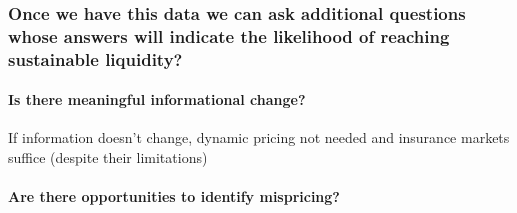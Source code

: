 \documentclass[authoryear]{article}
\begin{document}
\subsubsection{Once we have this data we can ask additional questions whose answers will indicate the likelihood of reaching sustainable liquidity?}

\paragraph{Is there meaningful informational change?}
If information doesn't change, dynamic pricing not needed and insurance markets suffice (despite their limitations)

\paragraph{Are there opportunities to identify mispricing?}




\end{document}
